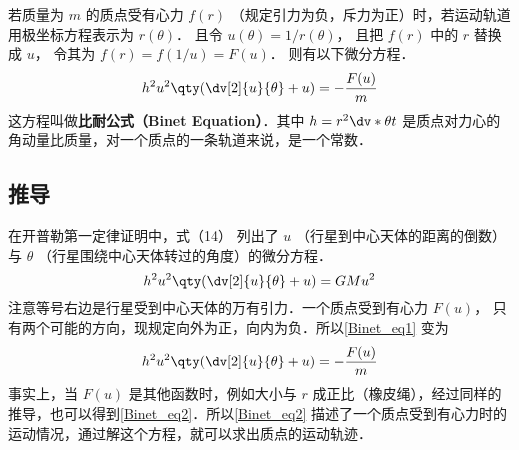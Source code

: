 

若质量为 $m$ 的质点受有心力 $f(r)$ （规定引力为负，斥力为正）时，若运动轨道用极坐标方程表示为 $r(\theta)$． 且令 $u(\theta) = 1/r(\theta)$， 且把 $f(r)$ 中的 $r$ 替换成 $u$， 令其为
 $f(r) = f(1/u) = F(u)$． 则有以下微分方程．
 \begin{equation}
{h^2}{u^2}\qty( \dv[2]{u}{\theta} + u ) = -\frac{F(u)}{m}
\end{equation} 
这方程叫做\textbf{比耐公式（Binet Equation）}．其中 $h = {r^2} \dv*{\theta}{t}$ 是质点对力心的角动量比质量，对一个质点的一条轨道来说，是一个常数．

\subsection{推导}
在开普勒第一定律证明中，式（14）%
列出了 $u$ （行星到中心天体的距离的倒数）与 $\theta $ （行星围绕中心天体转过的角度）的微分方程． 
\begin{equation}\label{Binet_eq1}
{h^2}{u^2} \qty( \dv[2]{u}{\theta} + u ) =  GMu^2
\end{equation} 
注意等号右边是行星受到中心天体的万有引力．一个质点受到有心力%
 $F(u)$， 只有两个可能的方向，现规定向外为正，向内为负．所以\autoref{Binet_eq1} 变为
\begin{equation}\label{Binet_eq2}
h^2 u^2 \qty( \dv[2]{u}{\theta} + u ) = -\frac{F(u)}{m}
\end{equation} 
事实上，当 $F(u)$ 是其他函数时，例如大小与 $r$ 成正比（橡皮绳），经过同样的推导，也可以得到\autoref{Binet_eq2}．所以\autoref{Binet_eq2} 描述了一个质点受到有心力时的运动情况，通过解这个方程，就可以求出质点的运动轨迹．














